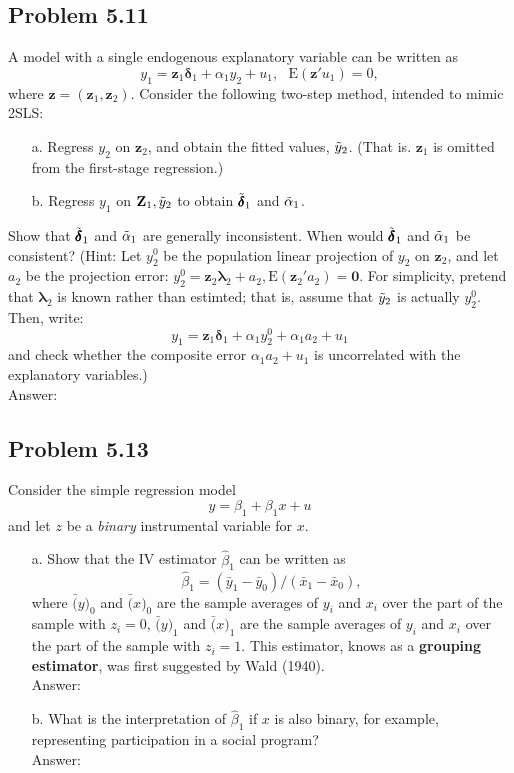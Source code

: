 \documentclass[10pt]{article}
\newcommand{\E}{\text{E}}
\begin{document}
\subsection*{Problem 5.11}
A model with a single endogenous explanatory variable can be written as
\[y_1=\textbf{z}_1\pmb{\delta}_1+\alpha_1y_2+u_1, \ \ \ \E(\textbf{z}'u_1)=0,\]
where $\textbf{z}=(\textbf{z}_1,\textbf{z}_2)$. Consider the following two-step method, intended to mimic 2SLS:
\begin{enumerate}
    \item[a.] Regress $y_2$ on $\textbf{z}_2$, and obtain the fitted values, $\Tilde{y}_2$. (That is. $\textbf{z}_1$ is omitted from the first-stage regression.)
    \item[b.] Regress $y_1$ on $\textbf{Z}_1, \Tilde{y}_2$ to obtain $\Tilde{\pmb{\delta}}_1$ and $\Tilde{\alpha}_1$. 
\end{enumerate}
Show that $\Tilde{\pmb{\delta}}_1$ and $\Tilde{\alpha}_1$ are generally inconsistent. When would $\Tilde{\pmb{\delta}}_1$ and $\Tilde{\alpha}_1$ be consistent? (Hint: Let $y_2^0$ be the population linear projection of $y_2$ on $\textbf{z}_2$, and let $a_2$ be the projection error: $y_2^0=\textbf{z}_2\pmb{\lambda}_2+a_2, \E(\textbf{z}_2'a_2)=\textbf{0}$. For simplicity, pretend that $\pmb{\lambda}_2$ is known rather than estimted; that is, assume that $\Tilde{y}_2$ is actually $y_2^0.$ Then, write:
\[y_1=\textbf{z}_1\pmb{\delta}_1+\alpha_1y_2^0+\alpha_1a_2+u_1\]
and check whether the composite error $\alpha_1a_2+u_1$ is uncorrelated with the explanatory variables.)
\\ Answer:\\



\subsection*{Problem 5.13}
Consider the simple regression model
\[y=\beta_1+\beta_1x+u\]
and let $z$ be a \textit{binary} instrumental variable for $x.$ 
\begin{enumerate}
\item[a.] Show that the IV estimator $\hat{\beta}_1$ can be written as
\[\hat{\beta}_1=(\bar{y}_1-\bar{y}_0)/(\bar{x}_1-\bar{x}_0),\]
where $\bar(y)_0$ and $\bar(x)_0$ are the sample averages of $y_i$ and $x_i$ over the part of the sample with $z_i=0$, $\bar(y)_1$ and $\bar(x)_1$ are the sample averages of $y_i$ and $x_i$ over the part of the sample with $z_i=1.$ This estimator, knows as a \textbf{grouping estimator}, was first suggested by Wald (1940).
\\ Answer:\\

\item[b.] What is the interpretation of $\hat{\beta}_1$ if $x$ is also binary, for example, representing participation in a social program?
\\ Answer:\\
\end{enumerate}
\end{document}
